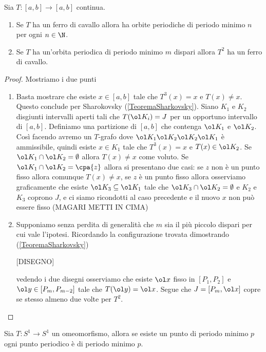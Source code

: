 \begin{proposition}\label{RelazioneFerroDiCavalloEPeriodiMinimi}
Sia $T:[a,b]\to[a,b]$ continua.
\begin{enumerate}
\item Se $T$ ha un ferro di cavallo allora ha orbite periodiche di periodo minimo $n$ per ogni $n\in\N$.
\item Se $T$ ha un'orbita periodica di periodo minimo $m$ dispari allora $T^2$ ha un ferro di cavallo. 
\end{enumerate}
\end{proposition}
\begin{proof}
Mostriamo i due punti
\begin{enumerate}
\item Basta mostrare che esiste $x\in [a,b]$ tale che $T^3(x)=x$ e $T(x)\neq x$. Questo conclude per Sharokovsky (\ref{TeoremaSharkovsky}). Siano $K_1$ e $K_2$ disgiunti intervalli aperti tali che $T(\ol K_i)=J$ per un opportuno intervallo di $[a,b]$. Definiamo una partizione di $[a,b]$ che contenga $\ol K_1$ e $\ol K_2$. Cos\`i facendo avremo un $T$-grafo dove $\ol K_1\ol K_2\ol K_2\ol K_1$ \`e ammissibile, quindi esiste $x\in K_1$ tale che $T^3(x)=x$ e $T(x)\in \ol K_2$. Se $\ol K_1\cap \ol K_2=\emptyset$ allora $T(x)\neq x$ come voluto. Se $\ol K_1\cap \ol K_2=\cpa{z}$ allora si presentano due casi: se $z$ non \`e un punto fisso allora comunque $T(x)\neq x$, se $z$ \`e un punto fisso allora osserviamo graficamente che esiste $\ol K_3\subseteq \ol K_1$ tale che $\ol K_3\cap \ol K_2=\emptyset$ e $K_2$ e $K_3$ coprono $J$, e ci siamo ricondotti al caso precedente e il nuovo $x$ non pu\`o essere fisso (MAGARI METTI IN CIMA)
\item Supponiamo senza perdita di generalit\`a che $m$ sia il pi\`u piccolo dispari per cui vale l'ipotesi. Ricordando la configurazione trovata dimostrando (\ref{TeoremaSharkovsky})

[DISEGNO]

vedendo i due disegni osserviamo che esiste $\ol x$ fisso in $[P_1,P_2]$ e $\ol y\in [P_{m},P_{m-2}]$ tale che $T(\ol y)=\ol x$. Segue che $J=[P_m,\ol x]$ copre se stesso almeno due volte per $T^2$.
\end{enumerate}
\end{proof}




\begin{proposition}[]
Sia $T:S^1\to S^1$ un omeomorfismo, allora se esiste un punto di periodo minimo $p$ ogni punto periodico \`e di periodo minimo $p$.
\end{proposition}